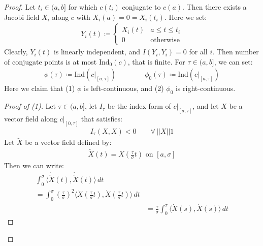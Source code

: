 \documentclass[11pt]{book}
\theoremstyle{break}
\theoremstyle{break}
\newcommand{\that}[1]{\widetilde{#1}}
\begin{document}
\begin{proof}
Let $t_i \in (a,b]$ for which $c(t_i)$ conjugate to $c(a)$. Then there exists a Jacobi field $X_i$ along $c$ with $X_i(a) = 0 = X_i(t_i)$. Here we set:
\begin{align*}
Y_i(t) \coloneqq \begin{cases}
X_i (t) & a\leq t \leq t_i\\
0 & \text{otherwise}
\end{cases}
\end{align*}
Clearly, $Y_i(t)$ is linearly independent, and $I(Y_i, Y_i) = 0$ for all $i$. Then number of conjugate points is at most $\text{Ind}_0(c)$, that is finite. For $\tau \in (a,b]$, we can set:
\begin{align*}
\phi(\tau) \coloneqq \text{Ind}\left( c|_{[a,\tau]}\right) \qquad\qquad \phi_0(\tau) \coloneqq\text{Ind}\left( c|_{[a,\tau]}\right)
\end{align*}
Here we claim that (1) $\phi$ is left-continuous, and (2) $\phi_0$ is right-continuous. \begin{proof}[Proof of (1)]
Let $\tau \in (a,b]$, let $I_{\tau}$ be the index form of $c|_{[a,\tau]}$, and let $X$ be a vector field along $c|_{[0,\tau]}$ that satisfies:
\begin{align*}
I_\tau (X,X) <0 \qquad \forall\, ||X||1
\end{align*}
Let $\that{X}$ be a vector field defined by:
\begin{align*}
\that{X} (t) = X\left( \frac{\tau}{\sigma}t\right) \text{ on }[a,\sigma]
\end{align*}
Then we can write:
\begin{align*}
\int_0^\sigma \langle \dot{\that{X}}(t), \dot{\that{X}}(t)\rangle \, dt\\
= \int_0^\sigma \left(\frac{\tau}{\sigma}\right)^2 \langle \dot{ X}\left(\frac{\tau}{\sigma}t\right), \dot{X}\left( \frac{\tau}{\sigma}t\right) \rangle \, dt \\
&= \frac{\tau}{\sigma}\int_0^\tau \langle \dot{X}(s), \dot{X}(s) \rangle \, dt 
\end{align*}

\end{proof}
\end{proof}
\end{document}
